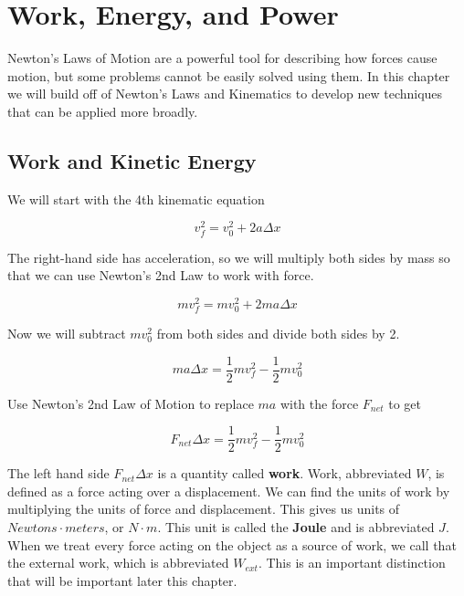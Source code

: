 \documentclass[12pt]{book}
\begin{document}
\chapter{Work, Energy, and Power}
\setcounter{example}{1}
\addtocounter{chp}{1}

Newton's Laws of Motion are a powerful tool for describing how forces cause motion, but some problems cannot be easily solved using them. In this chapter we will build off of Newton's Laws and Kinematics to develop new techniques that can be applied more broadly.

\section{Work and Kinetic Energy}

We will start with the 4th kinematic equation

\begin{equation}
v_f^2 = v_0^2 + 2 a \Delta x
\end{equation}

The right-hand side has acceleration, so we will multiply both sides by mass so that we can use Newton's 2nd Law to work with force.

\begin{equation}
m v_f^2 = m v_0^2 + 2 ma \Delta x
\end{equation}

Now we will subtract $m v_0^2$ from both sides and divide both sides by 2.

\begin{equation}
ma \Delta x = \frac{1}{2} m v_f^2 - \frac{1}{2} m v_0^2
\end{equation}

Use Newton's 2nd Law of Motion to replace $ma$ with the force $F_{net}$ to get

\begin{equation}
F_{net} \Delta x = \frac{1}{2} m v_f^2 - \frac{1}{2} m v_0^2
\label{WKEdef}
\end{equation}

The left hand side $F_{net} \Delta x$ is a quantity called \textbf{work}. Work, abbreviated $W$, is defined as a force acting over a displacement. We can find the units of work by multiplying the units of force and displacement. This gives us units of $Newtons \cdot meters$, or $N \cdot m$. This unit is called the \textbf{Joule} and is abbreviated $J$. When we treat every force acting on the object as a source of work, we call that the external work, which is abbreviated $W_{ext}$. This is an important distinction that will be important later this chapter.
\end{document}
